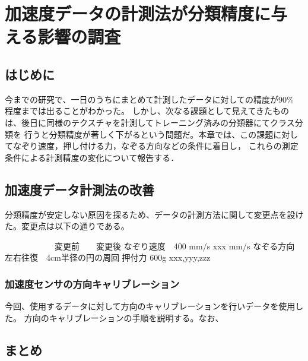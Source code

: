 ﻿\chapter{加速度データの計測法が分類精度に与える影響の調査}
\section{はじめに} 
今までの研究で、一日のうちにまとめて計測したデータに対しての精度が90\% 程度までは出ることがわかった。
しかし、次なる課題として見えてきたものは、後日に同様のテクスチャを計測してトレーニング済みの分類器にてクラス分類を
行うと分類精度が著しく下がるという問題だ。本章では、この課題に対してなぞり速度，押し付ける力，なぞる方向などの条件に着目し，
これらの測定条件による計測精度の変化について報告する．

\section{加速度データ計測法の改善}
分類精度が安定しない原因を探るため、データの計測方法に関して変更点を設けた。変更点は以下の通りである。

　　　　　　変更前　　変更後
なぞり速度　400 mm/s   xxx mm/s
なぞる方向  左右往復　4cm半径の円の周回
押付力      600g      xxx,yyy,zzz  
\subsection{加速度センサの方向キャリブレーション}
		今回、使用するデータに対して方向のキャリブレーションを行いデータを使用した。
		方向のキャリブレーションの手順を説明する。なお、
\section{}
	\subsection{}
	\subsection{}

\section{}

\section{まとめ}


